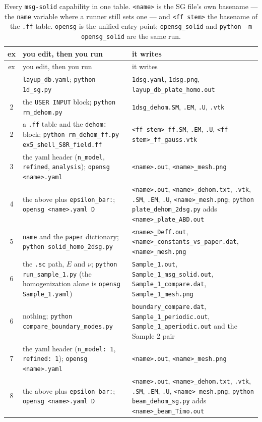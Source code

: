 \begingroup\footnotesize
\begin{longtable}{cp{4.6cm}p{8.4cm}}
\caption{Every \texttt{msg-solid} capability in one table. \texttt{<name>} is
the SG file's own basename --- the \texttt{name} variable where a runner still
sets one --- and \texttt{<ff stem>} the basename of the \texttt{.ff} table.
\texttt{opensg} is the unified entry point; \texttt{opensg\_solid} and
\texttt{python -m opensg\_solid} are the same run.}
\label{tab:solid-glance} \\
\toprule
ex & you edit, then you run & it writes \\
\midrule
\endfirsthead
\toprule
ex & you edit, then you run & it writes \\
\midrule
\endhead
\bottomrule
\endfoot
1 & \texttt{layup\_db.yaml}; \texttt{python 1d\_sg.py}
  & \texttt{1dsg.yaml}, \texttt{1dsg.png},
    \texttt{layup\_db\_plate\_homo.out} \\
2 & the \texttt{USER INPUT} block; \texttt{python rm\_dehom.py}
  & \texttt{1dsg\_dehom.SM}, \texttt{.EM}, \texttt{.U}, \texttt{.vtk} \\
2 & a \texttt{.ff} table and the \texttt{dehom:} block;
    \texttt{python rm\_dehom\_ff.py ex5\_shell\_S8R\_field.ff}
  & \texttt{<ff stem>\_ff.SM}, \texttt{.EM}, \texttt{.U},
    \texttt{<ff stem>\_ff\_gauss.vtk} \\
3 & the yaml header (\texttt{n\_model}, \texttt{refined}, \texttt{analysis});
    \texttt{opensg <name>.yaml}
  & \texttt{<name>.out}, \texttt{<name>\_mesh.png} \\
4 & the above plus \texttt{epsilon\_bar:};
    \texttt{opensg <name>.yaml D}
  & \texttt{<name>.out},
    \texttt{<name>\_dehom.txt}, \texttt{.vtk}, \texttt{.SM}, \texttt{.EM},
    \texttt{.U}, \texttt{<name>\_mesh.png};
    \texttt{python plate\_dehom\_2dsg.py} adds
    \texttt{<name>\_plate\_ABD.out} \\
5 & \texttt{name} and the \texttt{paper} dictionary;
    \texttt{python solid\_homo\_2dsg.py}
  & \texttt{<name>\_Deff.out},
    \texttt{<name>\_constants\_vs\_paper.dat}, \texttt{<name>\_mesh.png} \\
6 & the \texttt{.sc} path, $E$ and $\nu$; \texttt{python run\_sample\_1.py}
    (the homogenization alone is \texttt{opensg Sample\_1.yaml})
  & \texttt{Sample\_1.out}, \texttt{Sample\_1\_msg\_solid.out},
    \texttt{Sample\_1\_compare.dat}, \texttt{Sample\_1\_mesh.png} \\
6 & nothing; \texttt{python compare\_boundary\_modes.py}
  & \texttt{boundary\_compare.dat}, \texttt{Sample\_1\_periodic.out},
    \texttt{Sample\_1\_aperiodic.out} and the Sample 2 pair \\
7 & the yaml header (\texttt{n\_model: 1}, \texttt{refined: 1});
    \texttt{opensg <name>.yaml}
  & \texttt{<name>.out}, \texttt{<name>\_mesh.png} \\
8 & the above plus \texttt{epsilon\_bar:};
    \texttt{opensg <name>.yaml D}
  & \texttt{<name>.out},
    \texttt{<name>\_dehom.txt}, \texttt{.vtk}, \texttt{.SM}, \texttt{.EM},
    \texttt{.U}, \texttt{<name>\_mesh.png}; \texttt{python beam\_dehom\_sg.py}
    adds \texttt{<name>\_beam\_Timo.out} \\
\end{longtable}
\endgroup
